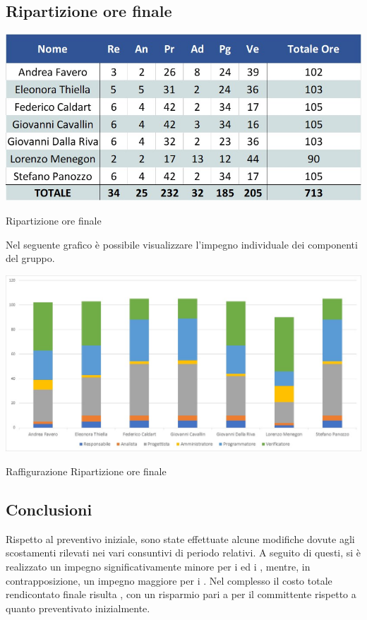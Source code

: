 \newpage
\subsection{Ripartizione ore finale}
\begin{table}[h!]
	\centerline{\includegraphics[scale=0.60]{img/Preventivo/Consuntivo/TotaleOre.jpg}}
	\caption{Ripartizione ore finale}
\end{table}

Nel seguente grafico è possibile visualizzare l'impegno individuale dei componenti del gruppo.

\begin{table}[h!]
	\centerline{\includegraphics[scale=0.55]{img/Preventivo/Istogrammi/TotaleOre.jpg}}
	\caption{Raffigurazione Ripartizione ore finale}
\end{table}

\subsection{Conclusioni}
Rispetto al preventivo iniziale, sono state effettuate alcune modifiche dovute agli scostamenti rilevati nei vari consuntivi di periodo relativi. A seguito di questi, si è realizzato un impegno significativamente minore per i \progs{} ed i \vers{}, mentre, in contrapposizione, un impegno maggiore per i \progrs{}. Nel complesso il costo totale rendicontato finale risulta , con un risparmio pari a  per il committente rispetto a quanto preventivato inizialmente.
